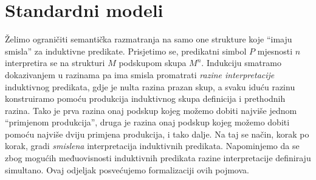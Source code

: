 \section{Standardni modeli}\label{sec:standardni-modeli}
Želimo ograničiti semantička razmatranja na samo one strukture koje \enquote{imaju smisla} za induktivne predikate.
Prisjetimo se, predikatni simbol \(P\) mjesnosti \(n\) interpretira se na strukturi \(M\)  podskupom skupa \(M^{n}\).
Indukciju smatramo dokazivanjem \textup{u razinama} pa ima smisla promatrati \textit{razine interpretacije} induktivnog predikata,
gdje je nulta razina prazan skup,
a svaku iduću razinu konstruiramo pomoću produkcija induktivnog skupa definicija i prethodnih razina.
Tako je prva razina onaj podskup kojeg možemo dobiti najviše jednom \enquote{primjenom produkcija},
druga je razina onaj podskup kojeg možemo dobiti pomoću najviše dviju primjena produkcija, i tako dalje.
Na taj se način, korak po korak, gradi \textit{smislena} interpretacija induktivnih predikata.
Napominjemo da se zbog mogućih međuovisnosti induktivnih predikata razine interpretacije definiraju simultano.
Ovaj odjeljak posvećujemo formalizaciji ovih pojmova.

